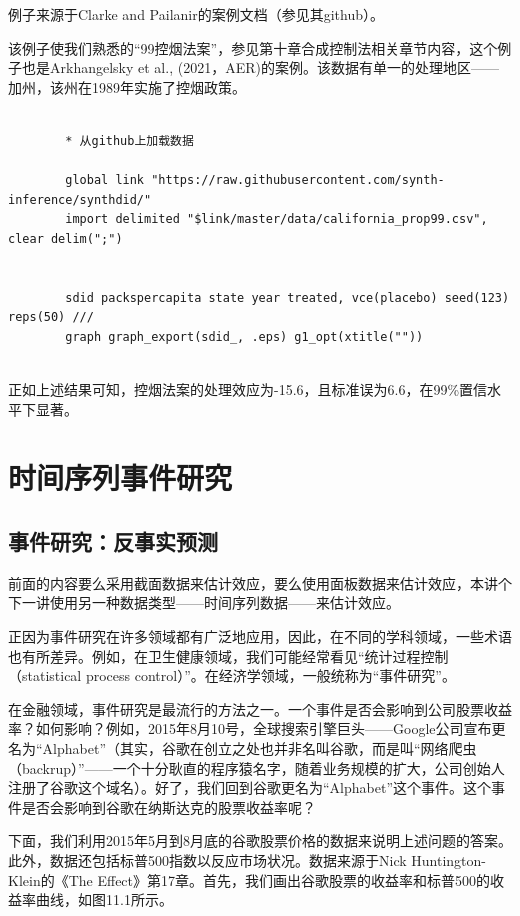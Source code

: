 \documentclass[cn,12pt,math=newtx,citestyle=gb7714-2015,bibstyle=gb7714-2015]{elegantbook}
\begin{document}
	例子来源于Clarke and Pailanir的案例文档（参见其github）。
	
	该例子使我们熟悉的“99控烟法案”，参见第十章合成控制法相关章节内容，这个例子也是Arkhangelsky et al., (2021，AER)的案例。该数据有单一的处理地区——加州，该州在1989年实施了控烟政策。
	
	\begin{lstlisting}
		
		* 从github上加载数据
		
		global link "https://raw.githubusercontent.com/synth-inference/synthdid/"
		import delimited "$link/master/data/california_prop99.csv", clear delim(";")
		
		
		sdid packspercapita state year treated, vce(placebo) seed(123) reps(50) ///
		graph graph_export(sdid_, .eps) g1_opt(xtitle(""))
		
	\end{lstlisting}
	
	正如上述结果可知，控烟法案的处理效应为-15.6，且标准误为6.6，在99\%置信水平下显著。
	
	
	\section{时间序列事件研究}
	
		\subsection{事件研究：反事实预测}
	
	前面的内容要么采用截面数据来估计效应，要么使用面板数据来估计效应，本讲个下一讲使用另一种数据类型——时间序列数据——来估计效应。
	
	正因为事件研究在许多领域都有广泛地应用，因此，在不同的学科领域，一些术语也有所差异。例如，在卫生健康领域，我们可能经常看见“统计过程控制（statistical process control）”。在经济学领域，一般统称为“事件研究”。
	
	在金融领域，事件研究是最流行的方法之一。一个事件是否会影响到公司股票收益率？如何影响？例如，2015年8月10号，全球搜索引擎巨头——Google公司宣布更名为“Alphabet”（其实，谷歌在创立之处也并非名叫谷歌，而是叫“网络爬虫（backrup）”——一个十分耿直的程序猿名字，随着业务规模的扩大，公司创始人注册了谷歌这个域名）。好了，我们回到谷歌更名为“Alphabet”这个事件。这个事件是否会影响到谷歌在纳斯达克的股票收益率呢？
	
	下面，我们利用2015年5月到8月底的谷歌股票价格的数据来说明上述问题的答案。此外，数据还包括标普500指数以反应市场状况。数据来源于Nick Huntington-Klein的《The Effect》第17章。首先，我们画出谷歌股票的收益率和标普500的收益率曲线，如图11.1所示。
	
\end{document}
